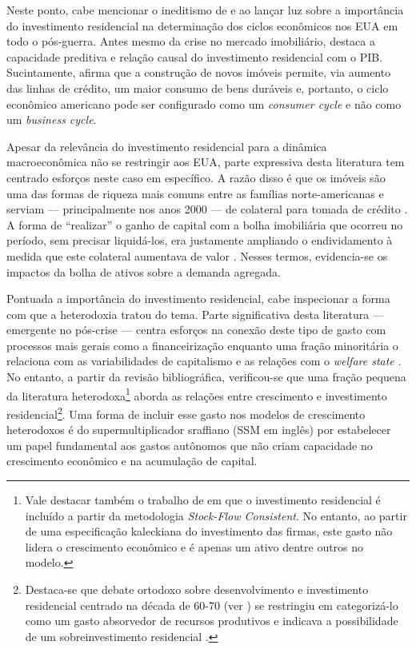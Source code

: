 Neste ponto, cabe mencionar o ineditismo de \textcite{green_follow_1997} e \textcite{leamer_housing_2007} ao lançar luz sobre a importância do investimento residencial na determinação dos ciclos econômicos nos EUA em todo o pós-guerra.
Antes mesmo da crise no mercado imobiliário,
\textcite{leamer_housing_2007} destaca a capacidade preditiva e relação causal  do investimento residencial com o PIB. Sucintamente, afirma que a construção de novos imóveis permite, via aumento das linhas de crédito, um maior consumo de bens duráveis e, portanto, o ciclo econômico americano pode ser configurado como um \textit{consumer cycle} e não como um \textit{business cycle}.

Apesar da relevância do investimento residencial para a dinâmica macroeconômica não se restringir aos EUA, parte expressiva desta literatura tem centrado esforços neste caso em específico. A razão disso é que os imóveis são  uma das formas de riqueza mais comuns entre as famílias norte-americanas e serviam --- principalmente nos anos 2000 --- de colateral para tomada de crédito \cite{teixeira_uma_2011}. A forma de ``realizar'' o ganho de capital com a bolha imobiliária que ocorreu no período, sem precisar liquidá-los, era justamente ampliando o endividamento à medida que este colateral aumentava de valor \cite{teixeira_crescimento_2015}. Nesses termos, evidencia-se os impactos da bolha de ativos sobre a demanda agregada. 

Pontuada a importância do investimento residencial, cabe inspecionar a forma com que a heterodoxia tratou do tema. Parte significativa desta literatura  --- emergente no pós-crise --- centra esforços na conexão deste tipo de gasto com processos mais gerais como a financeirização \cites{aalbers_financialization_2008}{bibow_financialization_2010} enquanto uma fração minoritária o relaciona com as variabilidades de capitalismo e as relações com o \textit{welfare state} \cite{schwartz_politics_2009}. 
No entanto, a partir da revisão bibliográfica, verificou-se que uma fração pequena da literatura heterodoxa\footnote{
	Vale destacar também o trabalho de \textcite{zezza_u.s._2008} em que o investimento residencial é incluído a partir da metodologia \textit{Stock-Flow Consistent}. No entanto, ao partir de uma especificação kaleckiana do investimento das firmas, este gasto não lidera o crescimento econômico e é apenas um ativo dentre outros no modelo.}
aborda as relações entre crescimento e investimento residencial\footnote{Destaca-se que debate ortodoxo sobre desenvolvimento e investimento residencial centrado na década de 60-70 (ver \textcite{arku_housing_2006}) se restringiu em categorizá-lo como um gasto absorvedor de recursos produtivos e indicava  a possibilidade de um sobreinvestimento residencial \cites{solow_importance_1995}{mills_has_1987}. }. 
Uma forma de incluir esse gasto nos modelos de crescimento heterodoxos é do supermultiplicador sraffiano (SSM em inglês) por estabelecer um papel fundamental aos gastos autônomos que não criam capacidade no crescimento econômico e na acumulação de capital.

